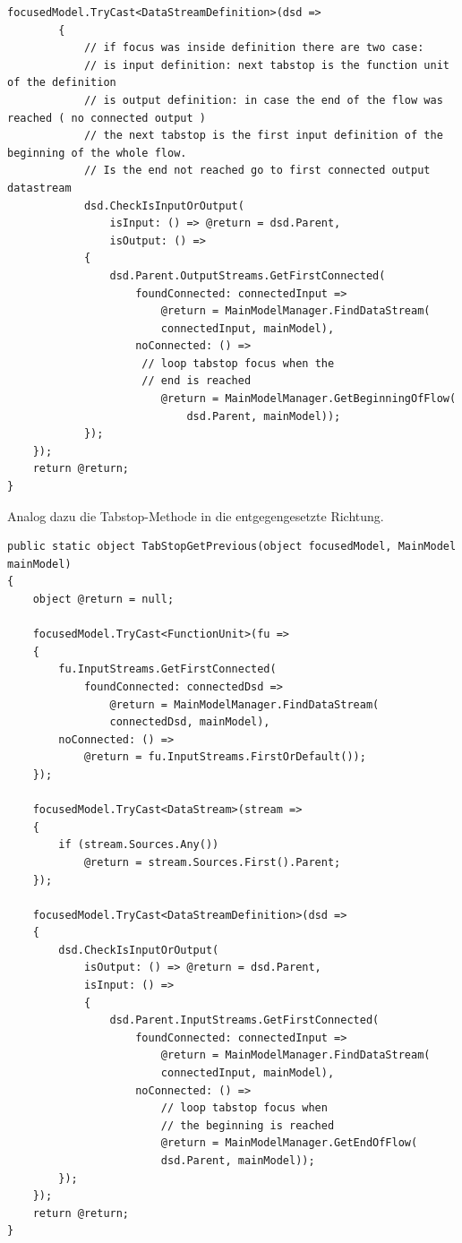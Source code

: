 \begin{enumerate}
\begin{lstlisting}[caption=Tabstop vorwärts]
		focusedModel.TryCast<DataStreamDefinition>(dsd =>
		{
			// if focus was inside definition there are two case:
			// is input definition: next tabstop is the function unit of the definition
			// is output definition: in case the end of the flow was reached ( no connected output ) 
			// the next tabstop is the first input definition of the beginning of the whole flow.
			// Is the end not reached go to first connected output datastream
			dsd.CheckIsInputOrOutput( 
				isInput: () => @return = dsd.Parent,
				isOutput: () =>
			{
				dsd.Parent.OutputStreams.GetFirstConnected(
					foundConnected: connectedInput => 
						@return = MainModelManager.FindDataStream(
						connectedInput, mainModel),
					noConnected: () =>
					 // loop tabstop focus when the 
					 // end is reached
						@return = MainModelManager.GetBeginningOfFlow(
							dsd.Parent, mainModel)); 
			});
	});
	return @return;
}

\end{lstlisting}
	Analog dazu die Tabstop-Methode in die entgegengesetzte Richtung.
	
	
\begin{lstlisting}[caption=Tabstop rückwärts]
public static object TabStopGetPrevious(object focusedModel, MainModel mainModel)
{
	object @return = null;
	
	focusedModel.TryCast<FunctionUnit>(fu => 
	{
		fu.InputStreams.GetFirstConnected(
			foundConnected: connectedDsd => 
				@return = MainModelManager.FindDataStream(
				connectedDsd, mainModel),
		noConnected: () =>
			@return = fu.InputStreams.FirstOrDefault());
	});
	
	focusedModel.TryCast<DataStream>(stream => 
	{
		if (stream.Sources.Any())
			@return = stream.Sources.First().Parent;
	});
	
	focusedModel.TryCast<DataStreamDefinition>(dsd => 
	{
		dsd.CheckIsInputOrOutput(
			isOutput: () => @return = dsd.Parent,
			isInput: () => 
			{
				dsd.Parent.InputStreams.GetFirstConnected(
					foundConnected: connectedInput =>
						@return = MainModelManager.FindDataStream(
						connectedInput, mainModel),
					noConnected: () =>
						// loop tabstop focus when
						// the beginning is reached
						@return = MainModelManager.GetEndOfFlow(
						dsd.Parent, mainModel));
		});
	});	
	return @return;
}
\end{lstlisting}
	
	


\end{enumerate}
